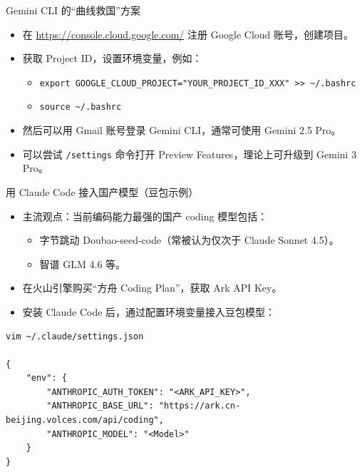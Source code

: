 \documentclass[10pt,aspectratio=169]{beamer}
\begin{document}
\begin{frame}[fragile]{Gemini CLI 的“曲线救国”方案}
  \begin{itemize}
    \item 在 \url{https://console.cloud.google.com/} 注册 Google Cloud 账号，创建项目。
    \item 获取 Project ID，设置环境变量，例如：
      \begin{itemize}
        \item \verb|export GOOGLE_CLOUD_PROJECT="YOUR_PROJECT_ID_XXX" >> ~/.bashrc|
        \item \verb|source ~/.bashrc|
      \end{itemize}
    \item 然后可以用 Gmail 账号登录 Gemini CLI，通常可使用 Gemini 2.5 Pro。
    \item 可以尝试 \texttt{/settings} 命令打开 Preview Features，理论上可升级到 Gemini 3 Pro。
  \end{itemize}
\end{frame}

\begin{frame}[fragile]{用 Claude Code 接入国产模型（豆包示例）}
  \begin{itemize}
    \item 主流观点：当前编码能力最强的国产 coding 模型包括：
      \begin{itemize}
        \item 字节跳动 Doubao-seed-code（常被认为仅次于 Claude Sonnet 4.5）。
        \item 智谱 GLM 4.6 等。
      \end{itemize}
    \item 在火山引擎购买“方舟 Coding Plan”，获取 Ark API Key。
    \item 安装 Claude Code 后，通过配置环境变量接入豆包模型：
  \end{itemize}

  \vspace{0.5em}
\begin{verbatim}
vim ~/.claude/settings.json

{
    "env": {
        "ANTHROPIC_AUTH_TOKEN": "<ARK_API_KEY>",
        "ANTHROPIC_BASE_URL": "https://ark.cn-beijing.volces.com/api/coding",
        "ANTHROPIC_MODEL": "<Model>"
    }
}
\end{verbatim}
\end{frame}
\end{document}
